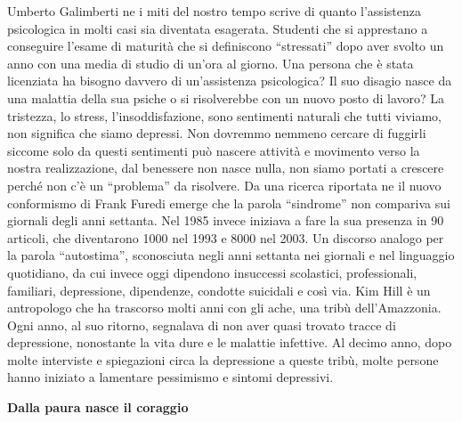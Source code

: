 \documentclass[12pt]{book} %
\begin{document}
\begin{mdframed}[linewidth=1pt]
Umberto Galimberti ne i miti del nostro tempo scrive di quanto
l'assistenza psicologica in molti casi sia diventata esagerata. Studenti che si apprestano a
conseguire l'esame di maturità che si definiscono “stressati” dopo aver svolto un anno con una
media di studio di un'ora al giorno. Una persona che è stata licenziata ha bisogno davvero di
un'assistenza psicologica? Il suo disagio nasce da una malattia della sua psiche o si risolverebbe
con un nuovo posto di lavoro? La tristezza, lo stress, l'insoddisfazione, sono sentimenti naturali
che tutti viviamo, non significa che siamo depressi. Non dovremmo nemmeno cercare di fuggirli siccome solo da questi
sentimenti può nascere attività e movimento verso la nostra realizzazione, dal benessere non nasce nulla, non siamo
portati a crescere perché non c'è un “problema” da risolvere. Da una ricerca riportata ne il nuovo
conformismo di Frank
Furedi emerge che la parola “sindrome” non compariva sui giornali degli anni settanta. Nel 1985 invece iniziava a fare
la sua presenza in 90 articoli, che diventarono 1000 nel 1993 e 8000 nel 2003. Un discorso analogo per la parola
“autostima”, sconosciuta negli anni settanta nei giornali e nel linguaggio quotidiano, da cui invece oggi dipendono
insuccessi scolastici, professionali, familiari, depressione, dipendenze, condotte suicidali e così via. Kim Hill è un
antropologo che ha trascorso molti anni con gli ache, una tribù dell'Amazzonia. Ogni anno, al suo
ritorno, segnalava di non aver quasi trovato tracce di depressione, nonostante la vita dure e le malattie infettive. Al
decimo anno, dopo molte interviste e spiegazioni circa la depressione a queste tribù, molte persone hanno iniziato a
lamentare pessimismo e sintomi depressivi.
\end{mdframed}

\textbf{Dalla paura nasce il coraggio}
\end{document}
